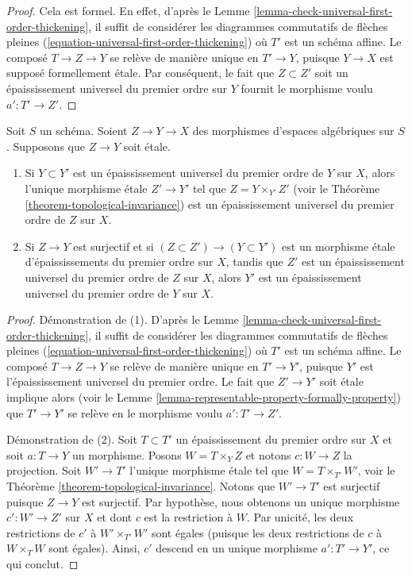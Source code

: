 \begin{proof}
Cela est formel. En effet, d'après le
Lemme \ref{lemma-check-universal-first-order-thickening},
il suffit de considérer les diagrammes commutatifs de flèches pleines
(\ref{equation-universal-first-order-thickening})
où $T'$ est un schéma affine. Le composé
$T \to Z \to Y$ se relève de manière unique en $T' \to Y$, puisque $Y \to X$ est
supposé formellement étale. Par conséquent, le fait que
$Z \subset Z'$ soit un épaississement universel du premier ordre sur $Y$
fournit le morphisme voulu $a' : T' \to Z'$.
\end{proof}

\begin{lemma}
\label{lemma-etale-morphism-of-universal-thickenings}
Soit $S$ un schéma.
Soient $Z \to Y \to X$ des morphismes d'espaces algébriques sur $S$.
Supposons que $Z \to Y$ soit étale.
\begin{enumerate}
\item Si $Y \subset Y'$ est un épaississement universel du premier ordre de
$Y$ sur $X$, alors l'unique morphisme étale $Z' \to Y'$ tel
que $Z = Y \times_{Y'} Z'$ (voir le
Théorème \ref{theorem-topological-invariance})
est un épaississement universel du premier ordre de $Z$ sur $X$.
\item Si $Z \to Y$ est surjectif et si
$(Z \subset Z') \to (Y \subset Y')$ est un morphisme étale
d'épaississements du premier ordre sur $X$, tandis que $Z'$ est un épaississement universel du
premier ordre de $Z$ sur $X$, alors $Y'$ est un épaississement universel du
premier ordre de $Y$ sur $X$.
\end{enumerate}
\end{lemma}

\begin{proof}
Démonstration de (1). D'après le
Lemme \ref{lemma-check-universal-first-order-thickening},
il suffit de considérer les diagrammes commutatifs de flèches pleines
(\ref{equation-universal-first-order-thickening})
où $T'$ est un schéma affine. Le composé
$T \to Z \to Y$ se relève de manière unique en $T' \to Y'$, puisque $Y'$ est
l'épaississement universel du premier ordre. Le fait que
$Z' \to Y'$ soit étale implique alors (voir le
Lemme \ref{lemma-representable-property-formally-property})
que $T' \to Y'$ se relève en le
morphisme voulu $a' : T' \to Z'$.

\medskip\noindent
Démonstration de (2). Soit $T \subset T'$ un épaississement du premier ordre sur
$X$ et soit $a : T \to Y$ un morphisme. Posons $W = T \times_Y Z$
et notons $c : W \to Z$ la projection.
Soit $W' \to T'$ l'unique morphisme étale tel que
$W = T \times_{T'} W'$, voir le
Théorème \ref{theorem-topological-invariance}.
Notons que $W' \to T'$ est surjectif puisque $Z \to Y$ est surjectif.
Par hypothèse, nous obtenons un unique morphisme $c' : W' \to Z'$
sur $X$ et dont $c$ est la restriction à $W$. Par unicité, les deux restrictions
de $c'$ à $W' \times_{T'} W'$ sont égales (puisque les deux restrictions de
$c$ à $W \times_T W$ sont égales). Ainsi, $c'$ descend en un unique
morphisme $a' : T' \to Y'$, ce qui conclut.
\end{proof}

